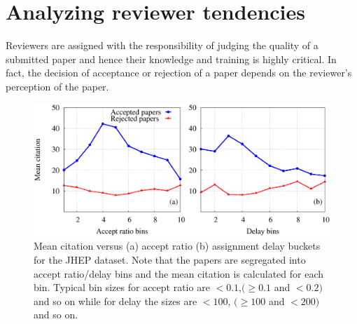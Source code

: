 \noindent
\section{Analyzing reviewer tendencies}
\label{reviewer}
Reviewers are assigned with the responsibility of judging the quality of a submitted paper and hence their knowledge and training is highly critical. 
In fact, the decision of acceptance or rejection of a paper depends on the reviewer's perception of the paper. 





\begin{figure}
 \centering
 \includegraphics[scale = 0.3]{./texfiles/Chapter_4/cikm_17/figures/citation_delay_acpt_ratio_jhep.eps}
 \caption{\label{a_d_jhep} Mean citation versus (a) accept ratio (b) assignment delay buckets for the JHEP dataset. 
 Note that the papers are segregated into accept ratio/delay bins and the mean citation is calculated for each bin. 
 Typical bin sizes for accept ratio are $<0.1$,$(\geq 0.1$ and $<0.2)$ and so on while for delay the sizes are $<100$, $(\geq 100$ and $< 200)$ and so on.}
\end{figure}

